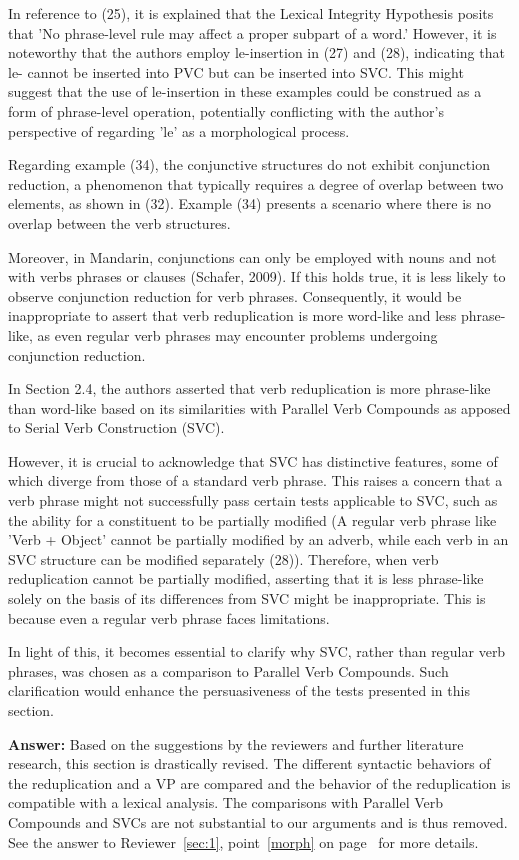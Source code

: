 \documentclass[fleqn,twoside]{article}
\begin{document}
\begin{enumerate}
In reference to (25), it is explained that the Lexical Integrity Hypothesis posits that 'No
phrase-level rule may affect a proper subpart of a word.' However, it is noteworthy that the authors
employ le-insertion in (27) and (28), indicating that le- cannot be inserted into PVC but can be
inserted into SVC. This might suggest that the use of le-insertion in these examples could be
construed as a form of phrase-level operation, potentially conflicting with the author's perspective
of regarding 'le' as a morphological process.

Regarding example (34), the conjunctive structures do not exhibit conjunction reduction, a phenomenon that typically requires a degree of overlap between two elements, as shown in (32). Example (34) presents a scenario where there is no overlap between the verb structures.

Moreover, in Mandarin, conjunctions can only be employed with nouns and not with verbs phrases or
clauses (Schafer, 2009). If this holds true, it is less likely to observe conjunction reduction for
verb phrases. Consequently, it would be inappropriate to assert that verb reduplication is more
word-like and less phrase-like, as even regular verb phrases may encounter problems undergoing
conjunction reduction.

In Section 2.4, the authors asserted that verb reduplication is more phrase-like than word-like based on its similarities with Parallel Verb Compounds as apposed to Serial Verb Construction (SVC).

However, it is crucial to acknowledge that SVC has distinctive features, some of which diverge from those of a standard verb phrase. This raises a concern that a verb phrase might not successfully pass certain tests applicable to SVC, such as the ability for a constituent to be partially modified (A regular verb phrase like 'Verb + Object' cannot be partially modified by an adverb, while each verb in an SVC structure can be modified separately (28)). Therefore, when verb reduplication cannot be partially modified, asserting that it is less phrase-like solely on the basis of its differences from SVC might be inappropriate. This is because even a regular verb phrase faces limitations.

In light of this, it becomes essential to clarify why SVC, rather than regular verb phrases, was
chosen as a comparison to Parallel Verb Compounds. Such clarification would enhance the
persuasiveness of the tests presented in this section.

\textbf{Answer:} Based on the suggestions by the reviewers and further literature research, this section is drastically revised.
The different syntactic behaviors of the reduplication and a VP are compared
and the behavior of the reduplication is compatible with a lexical analysis.
The comparisons with Parallel Verb Compounds and SVCs are not substantial to our arguments and is thus removed.
See the answer to Reviewer~\ref{sec:1}, point~\ref{morph} on page~\pageref{morph} for more details. 


\end{enumerate}
\end{document}
